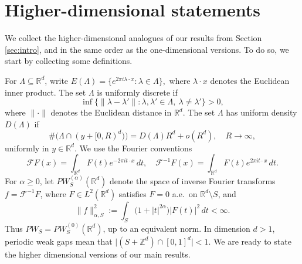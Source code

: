 \documentclass[reqno,a4paper,12pt]{amsart}
\numberwithin{equation}{section}
\def\Z{{\mathbb Z}}
\def\R{{\mathbb R}}
\newcommand{\Rd}{{\R^d}}
\newcommand\1{\mathds{1}}
\newcommand{\ift}{{\mathcal{F}^{-1}}}
\newcommand{\ft}{{\mathcal{F}}}
\begin{document}
\section{Higher-dimensional statements}\label{sec:higher-dim}

We collect the higher-dimensional analogues of our results from Section \ref{sec:intro}, and in the same order as the one-dimensional versions. To do so, we start by collecting some definitions.

For $\Lambda\subseteq\Rd$, write
$
    E(\Lambda)=\{e^{2\pi i\lambda\cdot x}:\lambda\in\Lambda\},
$
where $\lambda\cdot x$ denotes the Euclidean inner product. The set
$\Lambda$ is uniformly discrete if
\[
    \inf\{\|\lambda-\lambda'\|:\lambda,\lambda'\in\Lambda,
    \ \lambda\neq\lambda'\}>0,
\]
where $\| \cdot \|$ denotes the Euclidean distance in $\R^d$. The set $\Lambda$ has uniform density $D(\Lambda)$ if
\[
    \#\bigl(\Lambda\cap(y+[0,R)^d)\bigr)
    =D(\Lambda)R^d+o(R^d),\quad R\to\infty,
\]
uniformly in $y\in\Rd$. We use the Fourier conventions
\[
    \ft F(x)=\int_{\Rd}F(t)e^{-2\pi it\cdot x}\,dt,
    \quad
    \ift F(x)=\int_{\Rd}F(t)e^{2\pi it\cdot x}\,dt.
\]
For $\alpha\geq0$, let
$PW^{(\alpha)}_S(\Rd)$ denote the space of inverse Fourier transforms
$f=\ift F$, where $F\in L^2(\Rd)$ satisfies $F=0$ a.e.\ on $\Rd\setminus S$, and
\[
 \|f\|_{\alpha,S}^2:=\int_S\bigl(1+|t|^{2\alpha}\bigr)|F(t)|^2\,dt<\infty.
\]
Thus $PW_S=PW^{(0)}_S(\Rd)$, up to an equivalent norm.  In dimension $d>1$, periodic weak gaps mean that
$
 \bigl|(S+\Z^d)\cap[0,1]^d\bigr|<1.
$
We are ready to state the higher dimensional versions of our main results.

\vspace{0.3cm}
\end{document}
